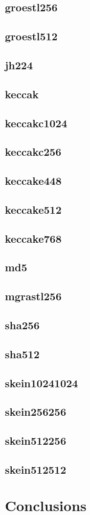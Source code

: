 \documentclass[10pt,a4paper]{article}
\begin{document}
\subsection{groestl256}
\subsection{groestl512}
\subsection{jh224}
\subsection{keccak}
\subsection{keccakc1024}
\subsection{keccakc256}
\subsection{keccake448}
\subsection{keccake512}
\subsection{keccake768}
\subsection{md5}
\subsection{mgrastl256}
\subsection{sha256}
\subsection{sha512}
\subsection{skein10241024}
\subsection{skein256256}
\subsection{skein512256}
\subsection{skein512512}

\section*{Conclusions}
\end{document}
